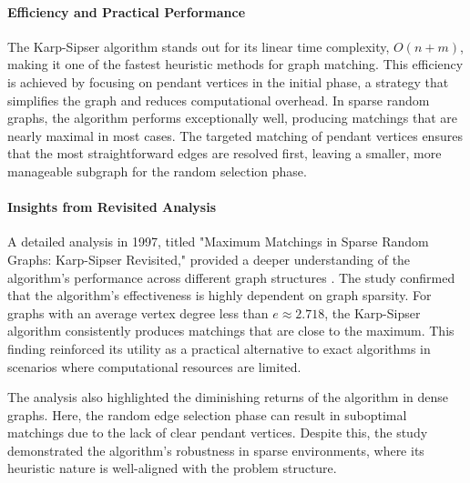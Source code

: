 \paragraph{Efficiency and Practical Performance}
The Karp-Sipser algorithm stands out for its linear time complexity, \(O(n + m)\), making it one of the fastest heuristic methods for graph matching. This efficiency is achieved by focusing on pendant vertices in the initial phase, a strategy that simplifies the graph and reduces computational overhead. In sparse random graphs, the algorithm performs exceptionally well, producing matchings that are nearly maximal in most cases. The targeted matching of pendant vertices ensures that the most straightforward edges are resolved first, leaving a smaller, more manageable subgraph for the random selection phase.

\paragraph{Insights from Revisited Analysis}
A detailed analysis in 1997, titled "Maximum Matchings in Sparse Random Graphs: Karp-Sipser Revisited," provided a deeper understanding of the algorithm’s performance across different graph structures \cite{aronson1997maximum}. The study confirmed that the algorithm’s effectiveness is highly dependent on graph sparsity. For graphs with an average vertex degree less than \(e \approx 2.718\), the Karp-Sipser algorithm consistently produces matchings that are close to the maximum. This finding reinforced its utility as a practical alternative to exact algorithms in scenarios where computational resources are limited.

The analysis also highlighted the diminishing returns of the algorithm in dense graphs. Here, the random edge selection phase can result in suboptimal matchings due to the lack of clear pendant vertices. Despite this, the study demonstrated the algorithm’s robustness in sparse environments, where its heuristic nature is well-aligned with the problem structure.

